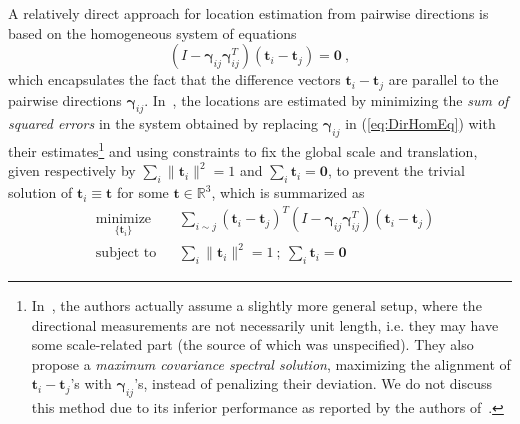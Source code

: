 \documentclass[10pt]{article}
\newcommand{\R}{\ensuremath{\mathbb{R}}}
\begin{document}
A relatively direct approach for location estimation from pairwise directions is based on the homogeneous system of equations
\begin{equation}
\label{eq:DirHomEq}
\left(I-\mathbf{\gamma}_{ij}\mathbf{\gamma}_{ij}^T\right)(\mathbf{t}_i-\mathbf{t}_j) = \mathbf{0} \ ,
\end{equation}
which encapsulates the fact that the difference vectors $\mathbf{t}_i-\mathbf{t}_j$ are parallel to the pairwise directions $\mathbf{\gamma}_{ij}$. In~\cite{BATL2}, the locations are estimated by minimizing the \textit{sum of squared errors} in the system obtained by replacing $\mathbf{\gamma}_{ij}$ in (\ref{eq:DirHomEq}) with their estimates\footnote{In~\cite{BATL2}, the authors actually assume a slightly more general setup, where the directional measurements are not necessarily unit length, i.e. they may have some scale-related part (the source of which was unspecified). They also propose a \textit{maximum covariance spectral solution}, maximizing the alignment of $\mathbf{t}_i-\mathbf{t}_j$'s with $\mathbf{\gamma}_{ij}$'s, instead of penalizing their deviation. We do not discuss this method due to its inferior performance as reported by the authors of~\cite{BATL2}.} and using constraints to fix the global scale and translation, given respectively by $\sum_i \|\mathbf{t}_i\|^2 = 1$ and $\sum_i \mathbf{t}_i = \mathbf{0}$, to prevent the trivial solution of $\mathbf{t}_i \equiv \mathbf{t}$ for some $\mathbf{t}\in\R^3$, which is summarized as
\begin{equation}
\label{eq:LS}
\begin{aligned}
&\underset{{\scriptstyle \{\mathbf{t}_i\}}}{\text{minimize}}
& & \sum_{i\sim j}  (\mathbf{t}_i-\mathbf{t}_j)^T\left(I-\mathbf{\gamma}_{ij}\mathbf{\gamma}_{ij}^T\right)(\mathbf{t}_i-\mathbf{t}_j) \\
& \text{subject to}
& & \sum_{i} \|\mathbf{t}_i\|^2 = 1 \ ; \ \sum_{i} \mathbf{t}_i = \mathbf{0}
\end{aligned}
\end{equation}
\end{document}
